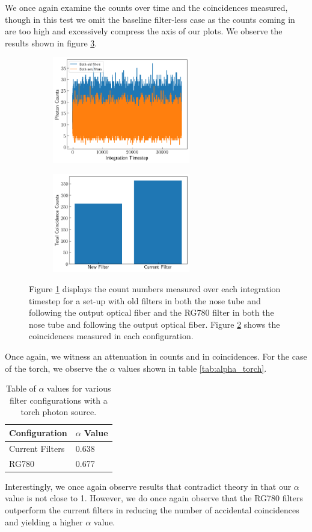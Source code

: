 \documentclass[letterpaper, 11 pt]{article}
\begin{document}
We once again examine the counts over time and the coincidences measured, though in this test
we omit the baseline filter-less case as the counts coming in are too high and excessively compress
the axis of our plots. We observe the results shown in figure \ref{fig:torch_filters}.
\begin{figure}[H]%
    \centering
    \begin{subfigure}{.4\textwidth}
    \includegraphics[width=6cm]{filter_ch1_torch.png}
    \caption{ }
    \label{fig:tch1}
    \end{subfigure}
    \begin{subfigure}{.4\textwidth}
    \includegraphics[width = 6cm]{filter_cc_torc.png}
    \caption{ }
    \label{fig:tcc}
    \end{subfigure}
    \caption{Figure \ref{fig:tch1} displays the count numbers measured over each
    integration timestep for a set-up with old filters in both the
    nose tube and following the output optical fiber and the RG780 filter in
    both the nose tube and following the output optical fiber. Figure
    \ref{fig:tcc} shows the coincidences measured in each configuration.}
    \label{fig:torch_filters}
\end{figure}
Once again, we witness an attenuation in counts and in coincidences. For the case of the
torch, we observe the $\alpha$ values shown in table \ref{tab:alpha_torch}.
\begin{table}[H]
    \centering
    \begin{tabular}{|l|l|}
    \hline
    \textbf{Configuration} & \textbf{$\alpha$ Value} \\ \hline
    Current Filters        & 0.638                   \\ \hline
    RG780                  & 0.677                   \\ \hline
    \end{tabular}
    \caption{Table of $\alpha$ values for various filter configurations with a torch photon source.}
\end{table}\label{tab:alpha_torch}
Interestingly, we once again observe results that contradict theory in that our $\alpha$ value
is not close to 1. However, we do once again observe that the RG780 filters outperform the current filters
in reducing the number of accidental coincidences and yielding a higher $\alpha$ value.
\end{document}
